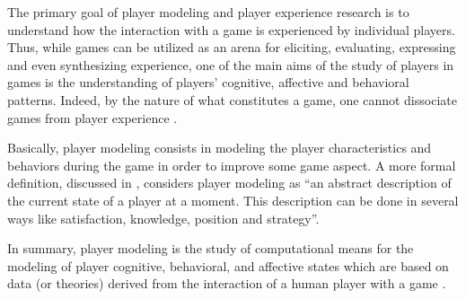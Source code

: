 The primary goal of player modeling and player experience research is to understand how the interaction with a game is experienced by individual players. Thus, while games can be utilized as an arena for eliciting, evaluating, expressing and even synthesizing experience, one of the main aims of the study of players in games is the understanding of players’ cognitive, affective and behavioral patterns. Indeed, by the nature of what constitutes a game, one cannot dissociate games from player experience \citep{YannakakisPlayerModeling2013}.

Basically, player modeling consists in modeling the player characteristics and behaviors during the game in order to improve some game aspect. A more formal definition, discussed in \citep{MachadoPlayermodelingcommon2011, HerikAdvancesComputerGames2006}, considers player modeling as \enquote{an abstract description of the current state of a player at a moment. This description can be done in several ways like satisfaction, knowledge, position and strategy}.

In summary, player modeling is the study of computational means for the modeling of player cognitive, behavioral, and affective states which are based on data (or theories) derived from the interaction of a human player with a game \citep{YannakakisGameAIRevisited2012}.

